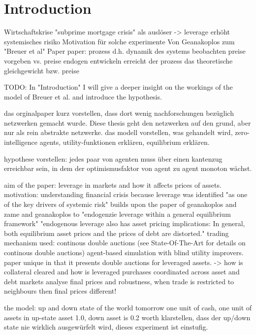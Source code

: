 \documentclass[Bachelorarbeit.tex]{subfiles}
\begin{document}
\chapter{Introduction}
Wirtschaftskrise "subprime mortgage crisis" als auslöser
		-> leverage erhöht systemisches risiko
	Motivation für solche experimente
	Von Geanakoplos zum "Breuer et al" Paper
		paper: prozess d.h. dynamik des systems beobachten
		preise vorgeben vs. preise endogen entwickeln
		erreicht der prozess das theoretische gleichgewicht bzw. preise







TODO:
In "Introduction" I will give a deeper insight on the workings of the model of Breuer et al. and introduce the hypothesis.

das orginalpaper kurz vorstellen, dass dort wenig nachforschungen bezüglich netzwerken gemacht wurde. Diese thesis geht den netzwerken auf den grund, aber nur als rein abstrakte netzwerke.
das modell vorstellen, was gehandelt wird, zero-intelligence agents, utility-funktionen erklären, equilibrium erklären.

hypothese vorstellen: jedes paar von agenten muss über einen kantenzug erreichbar sein, in dem der optimismusfaktor von agent zu agent monoton wächst.


aim of the paper:
leverage in markets and how it affects prices of assets.
motivation: understanding financial crisis because leverage was identified "as one of the key drivers of systemic risk"
builds upon the paper of geanakoplos and zame and geanakoplos to "endogenzie leverage within a general equilibrium framework"
"endogenous leverage also has asset pricing implications: In general, both equilibrium asset prices and the prices of debt are distorted."
trading mechanism used: continous double auctions (see State-Of-The-Art for details on continous double auctions)
agent-based simulation with blind utility improvers.
paper unique in that it presents double auctions for leveraged assets.
	-> how is collateral cleared and how is leveraged purchases coordinated across asset and debt markets
analyse final prices and robustness, when trade is restricted to neighbours then final prices different!

the model:
up and down state of the world tomorrow
one unit of cash, one unit of assets
in up-state asset 1.0, down asset is 0.2 worth
klarstellen, dass der up/down state nie wirklich ausgewürfelt wird, dieses experiment ist einstufig.
\end{document}
